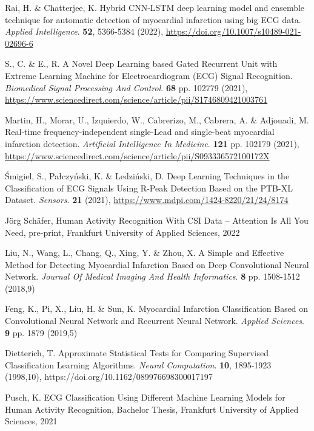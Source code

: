 \documentclass{ieeeaccess}
\begin{document}
\begin{thebibliography}{1}
Rai, H. \& Chatterjee, K. Hybrid CNN-LSTM deep learning model and ensemble technique for automatic detection of myocardial infarction using big ECG data. {\em Applied Intelligence}. \textbf{52}, 5366-5384 (2022), \url{https://doi.org/10.1007/s10489-021-02696-6}


S., C. \& E., R. A Novel Deep Learning based Gated Recurrent Unit with Extreme Learning Machine for Electrocardiogram (ECG) Signal Recognition. {\em Biomedical Signal Processing And Control}. \textbf{68} pp. 102779 (2021), \url{https://www.sciencedirect.com/science/article/pii/S1746809421003761}

Martin, H., Morar, U., Izquierdo, W., Cabrerizo, M., Cabrera, A. \& Adjouadi, M. Real-time frequency-independent single-Lead and single-beat myocardial infarction detection. {\em Artificial Intelligence In Medicine}. \textbf{121} pp. 102179 (2021), \url{https://www.sciencedirect.com/science/article/pii/S093336572100172X}

Śmigiel, S., Pałczyński, K. \& Ledziński, D. Deep Learning Techniques in the Classification of ECG Signals Using R-Peak Detection Based on the PTB-XL Dataset. {\em Sensors}. \textbf{21} (2021), \url{https://www.mdpi.com/1424-8220/21/24/8174}

Jörg Schäfer, Human Activity Recognition With CSI Data -- Attention Is All You Need, pre-print, Frankfurt University of Applied Sciences, 2022

Liu, N., Wang, L., Chang, Q., Xing, Y. \& Zhou, X. A Simple and Effective Method for Detecting Myocardial Infarction Based on Deep Convolutional Neural Network. {\em Journal Of Medical Imaging And Health Informatics}. \textbf{8} pp. 1508-1512 (2018,9)

Feng, K., Pi, X., Liu, H. \& Sun, K. Myocardial Infarction Classification Based on Convolutional Neural Network and Recurrent Neural Network. {\em Applied Sciences}. \textbf{9} pp. 1879 (2019,5)

Dietterich, T. Approximate Statistical Tests for Comparing Supervised Classification Learning Algorithms. {\em Neural Computation}. \textbf{10}, 1895-1923 (1998,10), https://doi.org/10.1162/089976698300017197

Pusch, K. ECG Classification Using Different Machine Learning Models for Human Activity Recognition, Bachelor Thesis, Frankfurt University of Applied Sciences, 2021


\end{thebibliography}
\end{document}
